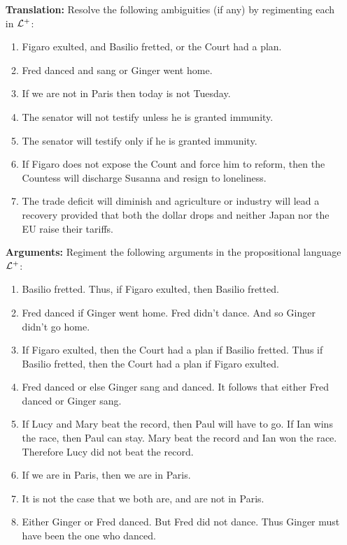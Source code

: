 \documentclass[a4paper, 11pt]{article} %
\begin{document}
\begin{enumerate}[leftmargin=1.2in,labelsep=.15in] 
\item[\bf Translation:] Resolve the following ambiguities (if any) by regimenting each in $\mathcal{L}^+$:
	\begin{enumerate}[label=\arabic*.]\small
	\item Figaro exulted, and Basilio fretted, or the Court had a plan.
	\item Fred danced and sang or Ginger went home.
	\item If we are not in Paris then today is not Tuesday.
	\item The senator will not testify unless he is granted immunity.
	\item The senator will testify only if he is granted immunity.
	\item If Figaro does not expose the Count and force him to reform, then the Countess will discharge Susanna and resign to loneliness.
	\item The trade deficit will diminish and agriculture or industry will lead a recovery provided that both the dollar drops and neither Japan nor the EU raise their tariffs.
	\end{enumerate}
\item[\bf Arguments:] Regiment the following arguments in the propositional language $\mathcal{L}^+$:
	\begin{enumerate}[label=\arabic*.]\small
	\item Basilio fretted. Thus, if Figaro exulted, then Basilio fretted.
	\item Fred danced if Ginger went home. Fred didn't dance. And so Ginger didn't go home.
	\item If Figaro exulted, then the Court had a plan if Basilio fretted. Thus if Basilio fretted, then the Court had a plan if Figaro exulted.
	\item Fred danced or else Ginger sang and danced. It follows that either Fred danced or Ginger sang.
	\item If Lucy and Mary beat the record, then Paul will have to go. If Ian wins the race, then Paul can stay. Mary beat the record and Ian won the race. Therefore Lucy did not beat the record.
	\item If we are in Paris, then we are in Paris.
	\item It is not the case that we both are, and are not in Paris.
	\item Either Ginger or Fred danced. But Fred did not dance. Thus Ginger must have been the one who danced.

\end{enumerate}
\end{enumerate}
\end{document}
